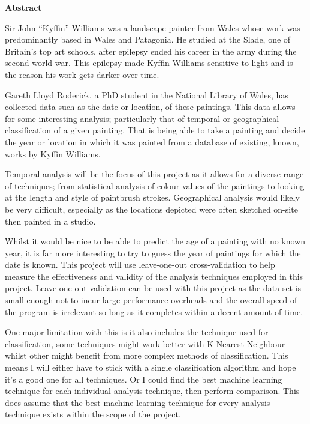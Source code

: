 \thispagestyle{empty}

\begin{center}
    {\LARGE\bf Abstract}
\end{center}

Sir John ``Kyffin'' Williams was a landscape painter from Wales whose work was predominantly based 
in Wales and Patagonia. He studied at the Slade, one of Britain's top art schools, after epilepsy
ended his career in the army during the second world war. This epilepsy made Kyffin Williams 
sensitive to light and is the reason his work gets darker over time\cite{Harris2011How}.

Gareth Lloyd Roderick, a PhD student in the National Library of Wales, has
collected data such as the date or location, of these paintings. This data allows for some 
interesting analysis; particularly that of temporal or geographical classification of a given 
painting. That is being able to take a painting and decide the year or location in which it was
painted from a database of existing, known, works by Kyffin Williams.

Temporal analysis will be the focus of this project as it allows for a diverse range of techniques;
from statistical analysis of colour values of the paintings to looking at the length and style of 
paintbrush strokes. Geographical analysis would likely be very difficult, especially as the locations
depicted were often sketched on-site then painted in a studio.

Whilst it would be nice to be able to predict the age of a painting with no known year, it is far
more interesting to try to guess the year of paintings for which the date is known. This project 
will use leave-one-out cross-validation to help measure the effectiveness and validity of the 
analysis techniques employed in this project. Leave-one-out validation can be used with this 
project as the data set is small enough not to incur large performance overheads and the overall
speed of the program is irrelevant so long as it completes within a decent amount of time.

One major limitation with this is it also includes the technique used for classification, some
techniques might work better with K-Nearest Neighbour whilst other might benefit from more complex
methods of classification. This means I will either have to stick with a single classification
algorithm and hope it's a good one for all techniques. Or I could find the best machine learning
technique for each individual analysis technique, then perform comparison. This does assume that
the best machine learning technique for every analysis technique exists within the scope of the
project.

